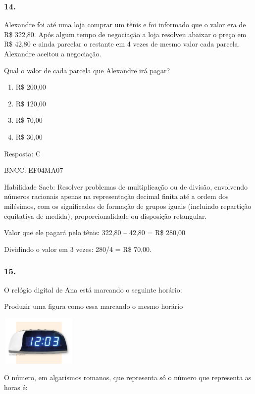 \subsubsection{14.}\label{section-200}

Alexandre foi até uma loja comprar um tênis e foi informado que o valor
era de R\$ 322,80. Após algum tempo de negociação a loja resolveu
abaixar o preço em R\$ 42,80 e ainda parcelar o restante em 4 vezes de
mesmo valor cada parcela. Alexandre aceitou a negociação.

Qual o valor de cada parcela que Alexandre irá pagar?

\begin{enumerate}
\def\labelenumi{\alph{enumi})}
\item
  R\$ 200,00
\item
  R\$ 120,00
\item
  R\$ 70,00
\item
  R\$ 30,00
\end{enumerate}

Resposta: C

BNCC: EF04MA07

Habilidade Saeb: Resolver problemas de multiplicação ou de divisão,
envolvendo números racionais apenas na representação decimal finita até
a ordem dos milésimos, com os significados de formação de grupos iguais
(incluindo repartição equitativa de medida), proporcionalidade ou
disposição retangular.

Valor que ele pagará pelo tênis: 322,80 -- 42,80 = R\$ 280,00

Dividindo o valor em 3 vezes: 280/4 = R\$ 70,00.

\subsubsection{15.}\label{section-201}

O relógio digital de Ana está marcando o seguinte horário:

Produzir uma figura como essa marcando o mesmo horário

\includegraphics[width=1.43346in,height=0.95842in]{media/image170.png}

O número, em algarismos romanos, que representa só o número que
representa as horas é:

